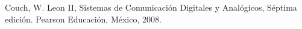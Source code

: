 \begin{thebibliography}{9}
 Couch, W. Leon II, Sistemas de Comunicación Digitales y Analógicos, 
Séptima edición. Pearson Educación, México, 2008.
\end{thebibliography}
